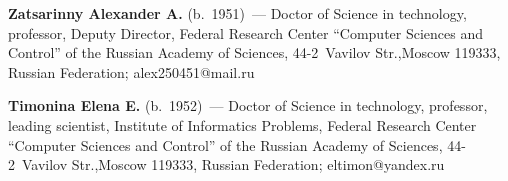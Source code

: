 \vspace*{3pt}

\noindent
\textbf{Zatsarinny Alexander A.} (b.\ 1951)~--- Doctor of Science in technology, 
professor, Deputy Director, Federal Research Center ``Computer Sciences and 
Control'' of the Russian Academy of Sciences, 44-2~Vavilov Str.,Moscow 119333, 
Russian Federation; \mbox{alex250451@mail.ru}

\vspace*{3pt}

\noindent
\textbf{Timonina Elena E.} (b.\ 1952)~--- Doctor of Science in technology, 
professor, leading scientist, Institute of Informatics Problems, Federal Research 
Center ``Computer Sciences and Control'' of the Russian Academy of Sciences,  
44-2~Vavilov Str.,Moscow 119333, Russian Federation; \mbox{eltimon@yandex.ru} 
  
\label{end\stat}


\renewcommand{\bibname}{\protect\rm Литература} 